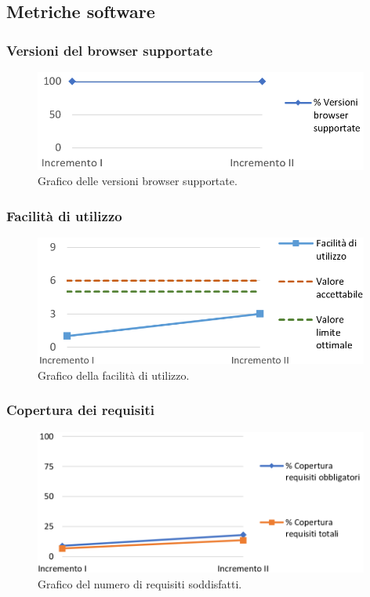 \subsection{Metriche software}

\subsubsection{Versioni del browser supportate}
\begin{figure}[h]
	\centering
	\includegraphics[width=11cm]{Images/vBrowser}
	\caption{Graﬁco delle versioni browser supportate.}
\end{figure}

\subsubsection{Facilità di utilizzo}
\begin{figure}[h]
	\centering
	\includegraphics[width=11cm]{Images/facUtilizzo}
	\caption{Graﬁco della facilità di utilizzo.}
\end{figure}

\subsubsection{Copertura dei requisiti}
\begin{figure}[h]
	\centering
	\includegraphics[width=11cm]{Images/copRequisiti}
	\caption{Graﬁco del numero di requisiti soddisfatti.}
\end{figure}

